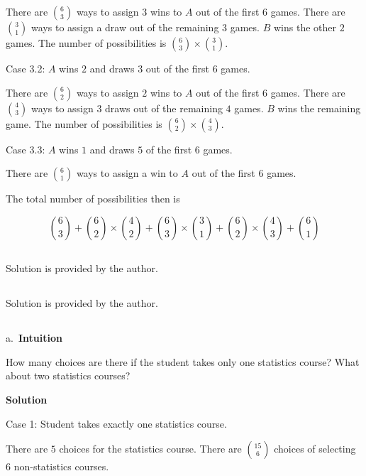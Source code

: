 \documentclass[]{book}
\begin{document}
There are \({6 \choose 3}\) ways to assign \(3\) wins to \(A\) out of
the first \(6\) games. There are \({3 \choose 1}\) ways to assign a draw
out of the remaining \(3\) games. \(B\) wins the other \(2\) games. The
number of possibilities is \({6 \choose 3} \times {3 \choose 1}\).

Case 3.2: \(A\) wins \(2\) and draws \(3\) out of the first \(6\) games.

There are \({6 \choose 2}\) ways to assign \(2\) wins to \(A\) out of
the first \(6\) games. There are \({4 \choose 3}\) ways to assign \(3\)
draws out of the remaining \(4\) games. \(B\) wins the remaining game.
The number of possibilities is \({6 \choose 2} \times {4 \choose 3}\).

Case 3.3: \(A\) wins \(1\) and draws \(5\) of the first \(6\) games.

There are \({6 \choose 1}\) ways to assign a win to \(A\) out of the
first \(6\) games.

The total number of possibilities then is

\[ {6 \choose 3} + {6 \choose 2} \times {4 \choose 2} + {6 \choose 3} \times {3 \choose 1} + {6 \choose 2} \times {4 \choose 3} + {6 \choose 1}\]

\subsection{}\label{section-7}

Solution is provided by the author.

\subsection{}\label{section-8}

Solution is provided by the author.

\subsection{}\label{section-9}

a.~\textbf{Intuition}

How many choices are there if the student takes only one statistics
course? What about two statistics courses?

 \textbf{Solution}

Case 1: Student takes exactly one statistics course.

There are \(5\) choices for the statistics course. There are
\({15 \choose 6}\) choices of selecting \(6\) non-statistics courses.
\end{document}
